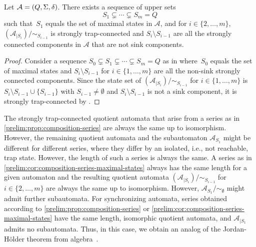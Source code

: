 \begin{proposition}\label{prelim:cor:composition-series-maximal-states}
	Let $\mathcal A = (Q, \Sigma, \delta)$.
	There exists a sequence of upper sets 
	\[
	S_1 \subsetneq \cdots \subsetneq S_m = Q
	\]
	such that~$S_1$ equals the set of maximal states in $\mathcal A$, and for $i \in \{2,\ldots,m\}$,
	$( \mathcal A_{|S_i} )/ {\sim_{S_{i-1}}}$
	is strongly trap-connected 
	and $S_{i} \setminus S_{i-1}$
	are all the strongly connected components in $\mathcal A$ that are not sink components.
\end{proposition} 
\begin{proof}
	Consider a sequence $S_0 \subsetneq S_1 \subsetneq \cdots \subsetneq S_m = Q$
	as in 
	where~$S_0$ equals the set of maximal states
	and $S_{i} \setminus S_{i-1}$
	for $i \in \{1,\ldots,m\}$ are all the non-sink strongly connected components.
	Since the state set of  $( \mathcal A_{|S_i} ) / {\sim_{S_{i-1}}}$ for $i \in \{1,\ldots,m\}$ 
	is $S_i \setminus S_{i-1} \cup \{S_{i-1}\}$ with $S_{i-1} \ne \emptyset$
	and  $S_i \setminus S_{i-1}$ 
	is not a sink component,
	it is strongly trap-connected
	by .	
\end{proof}

\begin{remark}
 The strongly trap-connected quotient automata
 that arise from a series as in \cref{prelim:prop:composition-series} 
 are always the same up to isomorphism.
 However, the remaining quotient automata
 and the subautomaton $\mathcal A_{S_1}$
 might be different for different series, where they
 differ by an isolated, i.e., not reachable, trap state.
 However, the length of such a series is always the same.
 A series as in \cref{prelim:cor:composition-series-maximal-states}
 always has the same length for a given automaton
 and the resulting quotient automata $( \mathcal A_{|S_i} )/ {\sim_{S_{i-1}}}$
 for $i \in \{2,\ldots,m\}$
 are always the same up to isomorphism.
 However, $\mathcal A_{S_1} / {\sim_{\emptyset}}$
 might admit further subautomata.
 For synchronizing automata,
 series obtained according
 to \cref{prelim:prop:composition-series} 
 or \cref{prelim:cor:composition-series-maximal-states}
 have the same length, isomorphic quotient automata,
 and $\mathcal A_{|S_1}$ admits no subautomata. 
 Thus, in this case, we obtain
 an analog of the Jordan-Hölder theorem
 from algebra~\cite{lang02}.	
\end{remark}

